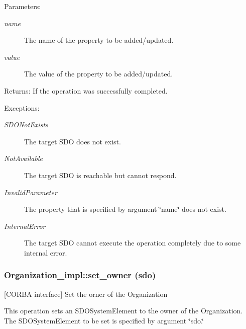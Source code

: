 \begin{Desc}
\item[Parameters:]
\begin{description}
\item[{\em name}]The name of the property to be added/updated. \item[{\em value}]The value of the property to be added/updated. \end{description}
\end{Desc}
\begin{Desc}
\item[Returns:]If the operation was successfully completed. \end{Desc}
\begin{Desc}
\item[Exceptions:]
\begin{description}
\item[{\em SDONot\-Exists}]The target SDO does not exist. \item[{\em Not\-Available}]The target SDO is reachable but cannot respond. \item[{\em Invalid\-Parameter}]The property that is specified by argument \char`\"{}name\char`\"{} does not exist. \item[{\em Internal\-Error}]The target SDO cannot execute the operation completely due to some internal error.\end{description}
\end{Desc}
\subsubsection{\setlength{\rightskip}{0pt plus 5cm}Organization\_\-impl::set\_\-owner (sdo)}\label{classOrganization__impl_Organization__impla7}


[CORBA interface] Set the orner of the Organization 

This operation sets an SDOSystem\-Element to the owner of the Organization. The SDOSystem\-Element to be set is specified by argument \char`\"{}sdo.\char`\"{}

